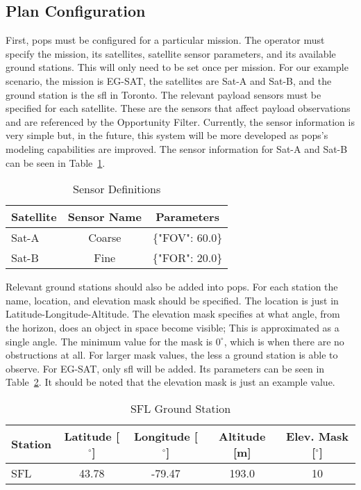 \subsection{Plan Configuration}

First, \gls{pops} must be configured for a particular mission. The operator
must specify the mission, its satellites, satellite sensor parameters, and its
available ground stations. This will only need to be set once per mission. For
our example scenario, the mission is EG-SAT, the satellites are Sat-A and
Sat-B, and the ground station is the \gls{sfl} in Toronto. The relevant payload
sensors must be specified for each satellite. These are the sensors that affect
payload observations and are referenced by the Opportunity Filter. Currently,
the sensor information is very simple but, in the future, this system will be
more developed as \gls{pops}'s modeling capabilities are improved. The sensor
information for Sat-A and Sat-B can be seen in Table~\ref{tab:sensors}. 

\begin{table}[h] 
    \centering
    \caption{Sensor Definitions}
    \begin{tabular}{ccc}
	Satellite                  & Sensor Name & Parameters    \\ \hline
	\multicolumn{1}{l|}{Sat-A} & Coarse      & \{"FOV": 60.0\} \\
	\multicolumn{1}{l|}{Sat-B} & Fine        & \{"FOR": 20.0\}
    \end{tabular}
    \label{tab:sensors}
\end{table}

Relevant ground stations should also be added into \gls{pops}. For each
station the name, location, and elevation mask should be specified. The
location is just in Latitude-Longitude-Altitude. The elevation mask specifies
at what angle, from the horizon, does an object in space become visible; This
is approximated as a single angle. The minimum value for the mask is $0^\circ$,
which is when there are no obstructions at all. For larger mask values, the
less a ground station is able to observe. For EG-SAT, only \gls{sfl} will be
added. Its parameters can be seen in Table~\ref{tab:ground-stations}. It should
be noted that the elevation mask is just an example value.

\begin{table}[h] 
    \centering
    \caption{SFL Ground Station}
    \begin{tabular}{ccccc}
	Station                  & Latitude [$^\circ$] & Longitude [$^\circ$] & Altitude [m] & Elev. Mask [$^\circ$] \\ \hline
	\multicolumn{1}{l|}{SFL} & 43.78   & -79.47   & 193.0  & 10      \\
    \end{tabular}
    \label{tab:ground-stations}
\end{table}

